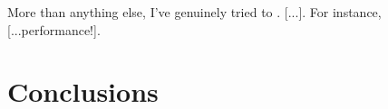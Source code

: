 \documentclass[a4paper, 11pt]{article}
\begin{document}
\begin{flushleft}
\vspace{5pt}\noindent
More than anything else, I've genuinely tried to . [...]. For instance, [...performance!].

\section{Conclusions}

\vspace{5pt}

\vspace{5pt}

\vspace{5pt}

\newpage


\end{flushleft}
\end{document}
